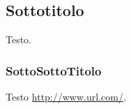 {	\subsection{Sottotitolo}{
		Testo.
		\subsubsection{SottoSottoTitolo}{
			Testo \url{http://www.url.com/}.
		}
	}
}
